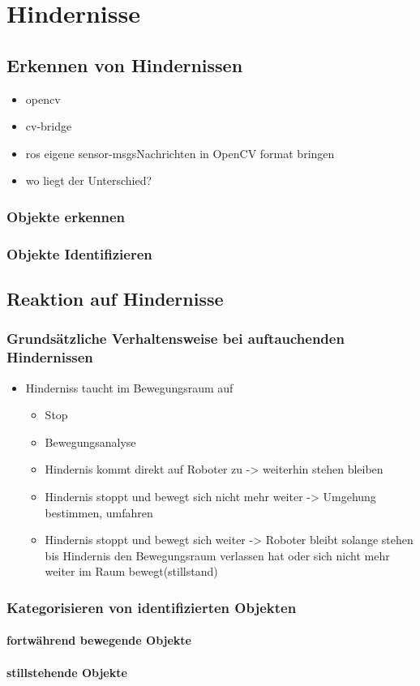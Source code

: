 \chapter{Hindernisse}
	\section{Erkennen von Hindernissen}
		\begin{itemize}
		\item opencv
		\item cv-bridge
		\item ros eigene sensor-msgs\images Nachrichten in OpenCV format bringen
		\item wo liegt der Unterschied?
		\end{itemize}
		\subsection{Objekte erkennen}
		\subsection{Objekte Identifizieren}
	\section{Reaktion auf Hindernisse}
		\subsection{Grundsätzliche Verhaltensweise bei auftauchenden Hindernissen}
		\begin{itemize}
		\item Hinderniss taucht im Bewegungsraum auf
			\begin{itemize}
				\item Stop
				\item Bewegungsanalyse
				\item Hindernis kommt direkt auf Roboter zu -> weiterhin stehen bleiben
				\item Hindernis stoppt und bewegt sich nicht mehr weiter -> Umgehung bestimmen, umfahren
				\item Hindernis stoppt und bewegt sich weiter -> Roboter bleibt solange stehen bis Hindernis den Bewegungsraum verlassen hat oder sich nicht mehr weiter im Raum bewegt(stillstand) 
			\end{itemize}
		\end{itemize}
		\subsection{Kategorisieren von identifizierten Objekten}
			\subsubsection{fortwährend bewegende Objekte}
			\subsubsection{stillstehende Objekte}
